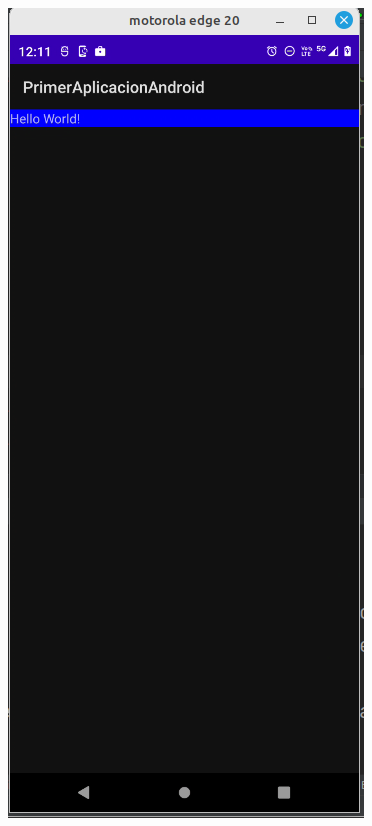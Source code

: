 \begin{frame}[fragile]
\begin{columns}
\begin{center}
\includegraphics[width=0.95\linewidth]{00_Modificacion/App_Version2.png}    
\end{center}
\end{columns}
\end{frame}
